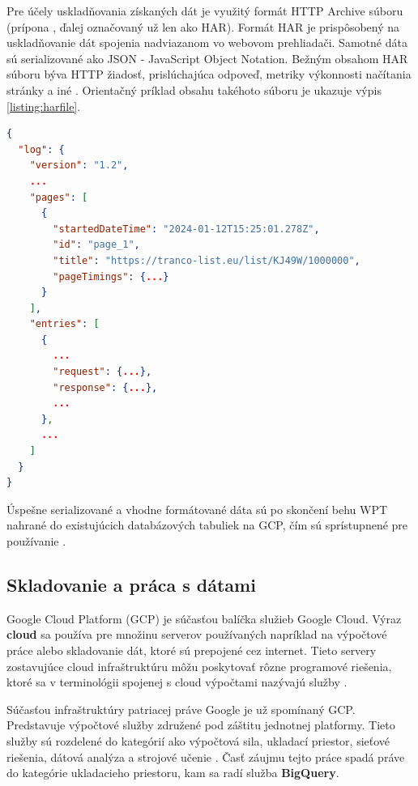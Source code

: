 Pre účely uskladňovania získaných dát je využitý formát HTTP Archive súboru (prípona , ďalej označovaný už len ako HAR).
Formát HAR je prispôsobený na uskladňovanie dát spojenia nadviazanom vo webovom prehliadači. Samotné dáta sú serializované ako JSON - JavaScript Object Notation.
Bežným obsahom HAR súboru býva HTTP žiadosť, prislúchajúca odpoveď, metriky výkonnosti načítania stránky a iné \cite{httparchive-harfile}. 
Orientačný príklad obsahu takéhoto súboru je ukazuje výpis \ref{listing:harfile}.

\begin{center}
\centering
\begin{lstlisting}[caption={\centering Orientačná ukážka obsahu súboru HAR. Všetky detaily o získaní zdroja z web servera je zaznamenaný v položke \code{"log"}. Hlavná štruktúra tejto položky je zložená z párov kľúč--hodnota, kde \code{"version"} definuje verziu súboru HAR , \code{pages} obsahuje napríklad URL získaného zdroja a \code{entries} obsahuje HTTP žiadosť \mbox{a odpoveď pre daný zdroj.}},
label=listing:harfile, 
language=json, 
frame=tb,
xleftmargin=.09\textwidth, 
xrightmargin=.09\textwidth]
{
  "log": {
    "version": "1.2",
    ...
    "pages": [
      {
        "startedDateTime": "2024-01-12T15:25:01.278Z",
        "id": "page_1",
        "title": "https://tranco-list.eu/list/KJ49W/1000000",
        "pageTimings": {...}
      }
    ],
    "entries": [
      {
        ...
        "request": {...},
        "response": {...},
        ...
      },
      ...
    ]
  }
}
\end{lstlisting}
\end{center}


Úspešne serializované a vhodne formátované dáta sú po skončení behu WPT nahrané do existujúcich databázových tabuliek na GCP, čím sú sprístupnené pre používanie \cite{httparchive-faq}. 

\subsection{Skladovanie a práca s dátami}
Google Cloud Platform (GCP) je súčasťou balíčka služieb Google Cloud. 
Výraz \textbf{cloud} sa používa pre množinu serverov používaných napríklad na výpočtové práce alebo skladovanie dát, ktoré sú prepojené cez internet.
Tieto servery zostavujúce cloud infraštruktúru môžu poskytovať rôzne programové riešenia, ktoré sa v terminológii spojenej s cloud výpočtami nazývajú služby \cite{cloudflare-clouddefinition}.

Súčasťou infraštruktúry patriacej práve Google je už spomínaný GCP. Predstavuje výpočtové služby združené pod záštitu jednotnej platformy.
Tieto služby sú rozdelené do kategórií ako výpočtová sila, ukladací priestor, sieťové riešenia, dátová analýza a strojové učenie \cite{gfg-gcp}.
Časť záujmu tejto práce spadá práve do kategórie ukladacieho priestoru, kam sa radí služba \textbf{BigQuery}.

